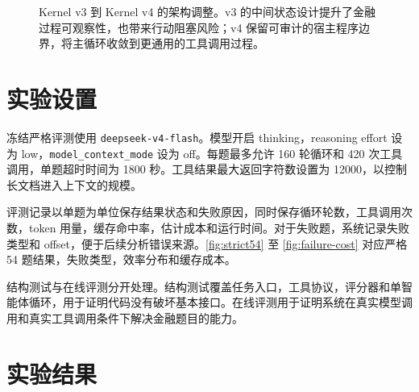\documentclass[12pt,a4paper,UTF8]{ctexart}
\newcommand{\toolname}[1]{\texttt{#1}}
\begin{document}
\begin{figure}[H]
\centering
{}
\caption{Kernel v3 到 Kernel v4 的架构调整。v3 的中间状态设计提升了金融过程可观察性，也带来行动阻塞风险；v4 保留可审计的宿主程序边界，将主循环收敛到更通用的工具调用过程。}
\label{fig:v3-v4}
\end{figure}

\section{实验设置}

冻结严格评测使用 \toolname{deepseek-v4-flash}。模型开启 thinking，reasoning effort 设为 low，\toolname{model\_context\_mode} 设为 off。每题最多允许 160 轮循环和 420 次工具调用，单题超时时间为 1800 秒。工具结果最大返回字符数设置为 12000，以控制长文档进入上下文的规模。

评测记录以单题为单位保存结果状态和失败原因，同时保存循环轮数，工具调用次数，token 用量，缓存命中率，估计成本和运行时间。对于失败题，系统记录失败类型和 offset，便于后续分析错误来源。\autoref{fig:strict54} 至 \autoref{fig:failure-cost} 对应严格 54 题结果，失败类型，效率分布和缓存成本。

结构测试与在线评测分开处理。结构测试覆盖任务入口，工具协议，评分器和单智能体循环，用于证明代码没有破坏基本接口。在线评测用于证明系统在真实模型调用和真实工具调用条件下解决金融题目的能力。

\section{实验结果}
\end{document}

